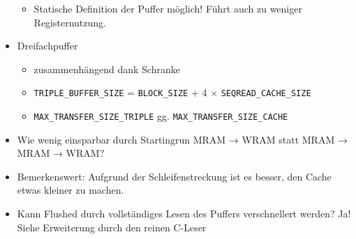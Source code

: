 \begin{itemize}
\begin{itemize}
		\item
		Statische Definition der Puffer möglich!
		Führt auch zu weniger Registernutzung.
	\end{itemize}

	\item
	Dreifachpuffer
	\begin{itemize}
		\item
		zusammenhängend dank Schranke

		\item
		\lstinline|TRIPLE_BUFFER_SIZE| = \lstinline|BLOCK_SIZE| + 4 × \lstinline|SEQREAD_CACHE_SIZE|

		\item
		\lstinline|MAX_TRANSFER_SIZE_TRIPLE| gg. \lstinline|MAX_TRANSFER_SIZE_CACHE|
	\end{itemize}

	\item
	Wie wenig einsparbar durch Startingrun MRAM → WRAM statt MRAM → MRAM → WRAM?

	\item
	Bemerkenswert:
	Aufgrund der Schleifenstreckung ist es besser, den Cache etwas kleiner zu machen.

	\item
	Kann Flushed durch vollständiges Lesen des Puffers verschnellert werden? Ja! Siehe Erweiterung durch den reinen C-Leser
\end{itemize}

\clearpage


\clearpage


\clearpage


